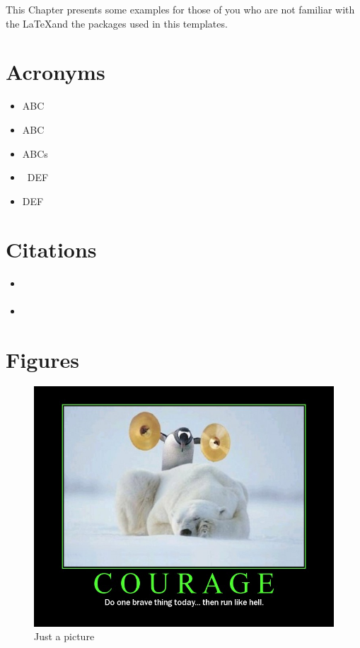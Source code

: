 %
This Chapter presents some examples for those of you who are not familiar with the \LaTeX and the packages used in this templates. \\
%
\section{Acronyms}
%
\begin{itemize}
	\item \gls{ABC} 	%
	\item \gls{ABC}		%
	\item \glspl{ABC}	%
	\item \acrshort{DEF}	%
	\item \gls{DEF}		%
\end{itemize}
%
\section{Citations}
%
\begin{itemize}
	\item \cite{whyinternetjustworks} 	%
	\item \cite{berkeleyclouds,art-and-asl} %
\end{itemize}
%
\clearpage
%
\section{Figures}
%
\begin{center} 					%
	\begin{figure}[htbc]			%
	\includegraphics[width=0.95 \linewidth]{contents/images/image_test} %
	\caption{Just a picture}
	\label{label:for:reference}		%
	\end{figure}
\end{center}
%
